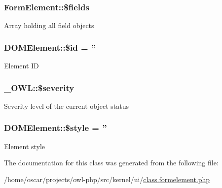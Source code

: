 \subsubsection[{\$fields}]{\setlength{\rightskip}{0pt plus 5cm}FormElement::\$fields}\label{classFormElement_a0aeb56027873fd2d3c58022f6b6bf182}
Array holding all field objects 
\subsubsection[{\$id}]{\setlength{\rightskip}{0pt plus 5cm}DOMElement::\$id = ''}\label{classDOMElement_a8b2176f3ade70abc7b41603618a992c0}
Element ID 
\subsubsection[{\$severity}]{\setlength{\rightskip}{0pt plus 5cm}\_\-OWL::\$severity}\label{class__OWL_ad26b40a9dbbacb33e299b17826f8327c}
Severity level of the current object status 
\subsubsection[{\$style}]{\setlength{\rightskip}{0pt plus 5cm}DOMElement::\$style = ''}\label{classDOMElement_aa678fb06bb8ffd915c7e6ded8cfc58b6}
Element style 

The documentation for this class was generated from the following file:\begin{DoxyCompactItemize}
\item 
/home/oscar/projects/owl-\/php/src/kernel/ui/\hyperlink{class_8formelement_8php}{class.formelement.php}\end{DoxyCompactItemize}
